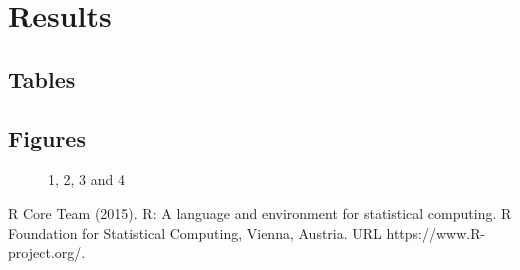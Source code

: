 \section{Results}


\subsection{Tables}


\subsection{Figures}

\begin{figure}[H]
	\centering
	\begin{minipage}[b]{0.5\linewidth}
	\end{minipage}\hfill
	\begin{minipage}[b]{0.5\linewidth}
	\end{minipage}\hfill	
	\begin{minipage}[b]{0.5\linewidth}
	\end{minipage}\hfill
	\begin{minipage}[b]{0.5\linewidth}
	\end{minipage}\hfill
	\caption{1, 2, 3 and 4}
	\label{fig:Figure1}
\end{figure} 




\begin{thebibliography}{00}

R Core Team (2015). 
\newblock R: A language and environment for statistical computing. R Foundation for Statistical Computing, Vienna, Austria.
\newblock URL https://www.R-project.org/.

\end{thebibliography}


